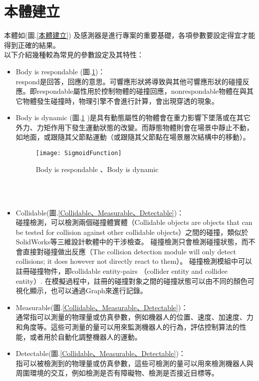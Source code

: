 \section{本體建立}
本體如(圖.\ref{本體建立}) 及感測器是進行專案的重要基礎，各項參數要設定得宜才能得到正確的結果。\\
以下介紹幾種較為常見的參數設定及其特性：
\begin{itemize}
\item Body is respondable (圖.\ref{Body is respondable 、Body is dynamic})：\\
respond是回答，回應的意思。可響應形狀將導致與其他可響應形狀的碰撞反應。即respondable屬性用於控制物體的碰撞回應，nonrespondable物體在與其它物體發生碰撞時，物理引擎不會進行計算，會出現穿透的現象。

\item Body is dynamic (圖.\ref{Body is respondable 、Body is dynamic} )是具有動態屬性的物體會在重力影響下墜落或在其它外力、力矩作用下發生運動狀態的改變。而靜態物體則會在場景中靜止不動，如地面，或跟隨其父節點運動（或跟隨其父節點在場景層次結構中的移動）。\\
\begin{figure}[hbt!]
\begin{center}
\texttt{[image: SigmoidFunction]}
\caption{\Large Body is respondable 、Body is dynamic}\label{Body is respondable 、Body is dynamic}
\end{center}
\end{figure}
\\
\\
\item Collidable(圖.\ref{Collidable、Measurable、Detectable})：\\
碰撞檢測，可以檢測兩個碰撞體實體（Collidable objects are objects that can be tested for collision against other collidable objects）之間的碰撞，類似於SolidWorks等三維設計軟體中的干涉檢查。 碰撞檢測只會檢測碰撞狀態，而不會直接對碰撞做出反應（The collision detection module will only detect collisions; it does however not directly react to them）。 碰撞檢測模組中可以註冊碰撞物件，即collidable entity-pairs （collider entity and collidee entity）. 在模擬過程中，註冊的碰撞對象之間的碰撞狀態可以由不同的顏色可視化顯示，也可以通過Graph來進行記錄。
\item Measurable(圖.\ref{Collidable、Measurable、Detectable})：\\
通常指可以測量的物理量或仿真參數，例如機器人的位置、速度、加速度、力和角度等。這些可測量的量可以用來監測機器人的行為，評估控制算法的性能，或者用於自動化調整機器人的運動。\\
\item Detectable(圖.\ref{Collidable、Measurable、Detectable})：\\
指可以被檢測到的物理量或仿真參數，這些可檢測的量可以用來檢測機器人與周圍環境的交互，例如檢測是否有障礙物、檢測是否接近目標等。\\
\end{itemize}
\newpage
